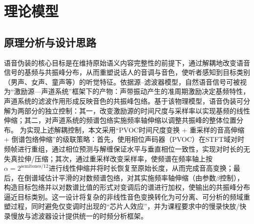 \documentclass[12pt,a4paper]{article}
\begin{document}
\section{理论模型}
\subsection{原理分析与设计思路}
语音伪装的核心目标是在维持原始语义内容完整性的前提下，通过解耦地改变语音信号的基频与共振峰分布，从而重塑说话人的音调与音色，使听者感知到目标类别（男声、女声、童声等）的听觉特征。依据源–滤波器模型，自然语音信号可被视为“激励源—声道系统”框架下的产物：声带振动产生的准周期激励决定基频特性，声道系统的滤波作用形成反映音色的共振峰包络。基于该物理模型，语音伪装可分解为两部分的独立控制：其一，改变激励源的时间尺度与采样率以实现基频的线性伸缩；其二，对声道系统的频谱包络实施频率轴伸缩以调整共振峰的整体位置分布。
为实现上述解耦控制，本文采用“PVOC时间尺度变换 + 重采样的音高伸缩 + 倒谱包络伸缩”的级联策略：首先，使用相位声码器（PVOC）在STFT域对时频帧进行重组，通过相位预测与解缠保证水平与垂直相位一致性，实现对时长的无失真拉伸/压缩；其次，通过重采样改变采样率，使频谱在频率轴上按$\alpha=2^{\mathrm{semitones}/12}$进行线性伸缩并将时长恢复至原始长度，从而完成音高变换；最后，在倒谱域估计平滑的对数频谱包络，对其实施频率轴伸缩（由参数$\beta$控制），构造目标包络并以对数谱比值的形式对变调后的谱进行加权，使输出的共振峰分布逼近目标类别。这一设计将复杂的非线性音色变换转化为可分离、可分析的频域重塑过程，同时避免仅变调时出现的“芯片人效应”，并为课程要求中的慢录快放/快录慢放与滤波器设计提供统一的时频分析框架。
\end{document}
